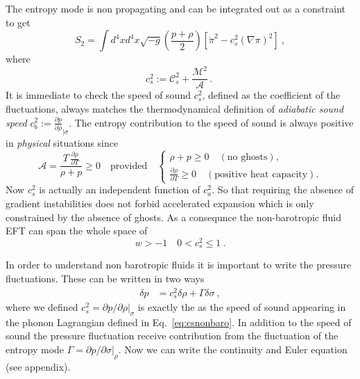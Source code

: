 The entropy mode is non propagating and can be integrated out as a constraint to get 
\begin{equation}
S_2=\int d^4xd^4x\sqrt{-g}\left(\frac{p+\rho}{2}\right)\left[\dot\pi^2-c_s^2(\nabla\pi)^2\right]\ , 
\end{equation}
where
\begin{equation}
    c_s^2:=\mathcal{C}_s^2+\frac{\mathcal{M}^2}{\mathcal{A}}\,.\;\label{eq:csnonbaro} 
\end{equation}
It is immediate to check the speed of sound $c_s^2$, defined as the coefficient of the fluctuations, always matches the thermodynamical definition of \emph{adiabatic sound speed} $c_b^2:= \frac{\partial p}{\partial \rho}_{\mid \sigma}$.
The entropy contribution to the speed of sound is always positive in \emph{physical} situations since
\begin{equation}
    \mathcal{A}= \frac{T\, \frac{\partial\rho }{\partial T}}{\rho+p}\geq 0 \quad\text{provided}\quad
    \begin{cases}
        \rho+p\geq 0 \quad(\text{no ghosts}),\\
        \frac{\partial\rho }{\partial T} \geq 0 \quad(\text{positive heat capacity}).
    \end{cases} 
\end{equation}
Now $c_s^2$ is actually an independent function of $c_a^2$. So that requiring the absence of gradient instabilities does not forbid accelerated expansion which is only constrained by the absence of ghosts. As a consequnce the non-barotropic fluid EFT can span the whole space of 
\begin{equation}
w>-1\quad 0<c_s^2\leq1\ .    
\end{equation}

In order to understand non barotropic fluids it is important to write the pressure fluctuations. These can be written in two ways 
\begin{align}
\delta p &=c_s^2\delta\rho+\Gamma\delta \sigma\ ,
\end{align}
where we defined $c_s^2=\partial p/\partial \rho\vert_\sigma$ is exactly the as the speed of sound appearing in the phonon Lagrangian defined in Eq.~\eqref{eq:csnonbaro}. In addition to the speed of sound the pressure fluctuation receive contribution from the fluctuation of the entropy mode $\Gamma=\partial p/\partial \sigma\vert_\rho$. 
Now we can write the continuity and Euler equation (see appendix).



